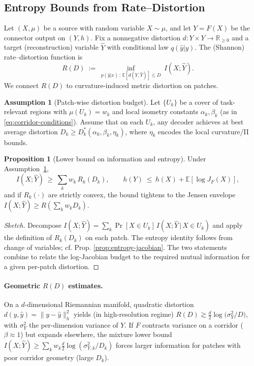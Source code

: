 \documentclass{article}
\theoremstyle{definition}
\newtheorem{assumption}{Assumption}[section]
\newtheorem{proposition}[theorem]{Proposition}
\begin{document}
\subsection{Entropy Bounds from Rate--Distortion}

Let $(X,\mu)$ be a source with random variable $X\sim \mu$, and let
$Y=F(X)$ be the connector output on $(Y,h)$. Fix a nonnegative distortion
$d:Y\times Y\to\mathbb{R}_{\ge 0}$ and a target (reconstruction) variable
$\widehat Y$ with conditional law $q(\widehat y|y)$. The (Shannon) rate--distortion
function is
\[
R(D)\ :=\ \inf_{p(\widehat y|x)\,:\,\mathbb{E}[d(Y,\widehat Y)]\le D}\ I(X;\widehat Y).
\]
We connect $R(D)$ to curvature-induced metric distortion on patches.

\begin{assumption}[Patch-wise distortion budget]
\label{ass:patch-D}
Let $\{U_k\}$ be a cover of task-relevant regions with $\mu(U_k)=w_k$ and
local isometry constants $\alpha_k,\beta_k$ (as in \eqref{eq:corridor-conditions}).
Assume that on each $U_k$, any decoder achieves at best average distortion
$D_k\ge D^\ast_k(\alpha_k,\beta_k,\eta_k)$, where $\eta_k$ encodes the
local curvature/II bounds.
\end{assumption}

\begin{proposition}[Lower bound on information and entropy]
\label{prop:RD-lower}
Under Assumption~\ref{ass:patch-D},
\[
I(X;\widehat Y) \ \ge\ \sum_k w_k\, R_k(D_k),
\qquad
h(Y)\ \le\ h(X) + \mathbb{E}[\log J_F(X)],
\]
and if $R_k(\cdot)$ are strictly convex, the bound tightens to the Jensen
envelope $I(X;\widehat Y)\ge R(\sum_k w_k D_k)$.
\end{proposition}

\begin{proof}[Sketch]
Decompose $I(X;\widehat Y)=\sum_k \Pr[X\in U_k]\,
I(X;\widehat Y\,|\,X\in U_k)$ and apply the definition of $R_k(D_k)$ on each
patch. The entropy identity follows from change of variables; cf. Prop.
\ref{prop:entropy-jacobian}. The two statements combine to relate the
log-Jacobian budget to the required mutual information for a given per-patch
distortion.
\end{proof}

\paragraph{Geometric $R(D)$ estimates.}
On a $d$-dimensional Riemannian manifold,
quadratic distortion $d(y,\widehat y)=\|y-\widehat y\|_h^2$ yields
(in high-resolution regime) $R(D)\gtrsim \tfrac{d}{2}\log\!\big(\sigma_Y^2/D\big)$,
with $\sigma_Y^2$ the per-dimension variance of $Y$.
If $F$ contracts variance on a corridor ($\beta\approx 1$) but expands elsewhere,
the mixture lower bound
\(
I(X;\widehat Y)\ge \sum_k w_k \tfrac{d}{2}\log(\sigma_{Y,k}^2/D_k)
\)
forces larger information for patches with poor corridor geometry (large $D_k$).
\end{document}
